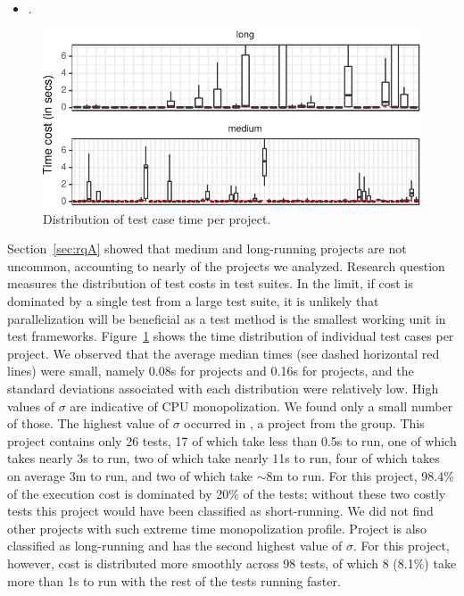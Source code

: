 \documentclass[10pt,journal,compsoc]{IEEEtran}
\begin{document}
\begin{itemize}
  \item \numRQFeasibilityTwo. \textbf{\RQFeasibilityTwo}
\end{itemize}

\begin{figure}[t!]
  \centering
  \includegraphics[width=.48\textwidth]{results/testcost-distribution.pdf}
  \vspace{-2mm}
  \caption{\label{fig:time-distributions}Distribution of test case time per project.}%
  \vspace{-5mm}
\end{figure}

Section~\ref{sec:rqA} showed that medium and long-running projects are
not uncommon, accounting to nearly \percentMedLongRunning{} of the
\numSubjs{} projects we analyzed.  Research question \numRQFeasibilityTwo{}
measures the distribution of test costs in test suites.  In
the limit, if cost is dominated by a single test from a large test
suite, it is unlikely that parallelization will be beneficial as a
test method is the smallest working unit in test frameworks.
Figure~\ref{fig:time-distributions} shows the time distribution of
individual test cases per project.
We observed that the average median times (see dashed horizontal red
lines) were small, namely 0.08s
for \medg{} projects and 0.16s for \longg{} projects, and the standard deviations associated with each distribution were
relatively low. High values of
$\sigma$ are indicative of CPU monopolization. We found only a small number
of those. The highest value of $\sigma$ occurred in
, a project from the \longg{} group.
This project contains only 26 tests, 17 of which take less than 0.5s
to run, one of which takes nearly 3s to run, two of which take nearly
11s to run, four of which takes on average 3m to run, and two of which
take $\sim$8m to run.
For this project, 98.4\% of the execution cost is dominated by 20\% of
the tests; without these two costly tests this project would have been
classified as short-running.
We did not find other projects with such extreme time monopolization
profile.
Project  is also classified as
long-running and has the second highest value of $\sigma$.
For this project, however, cost is distributed more smoothly across 98
tests, of which 8 (8.1\%) take more than 1s to run with the rest of
the tests running faster.
\end{document}

